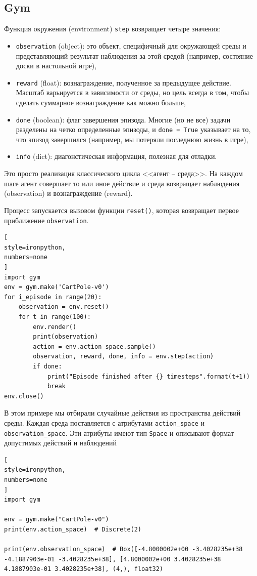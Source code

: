 \documentclass[%
	11pt,
	a4paper,
	utf8,
		]{article}
\begin{document}
\subsection{Gym}

Функция окружения (environment) \texttt{step} возвращает четыре значения:
\begin{itemize}
	\item \verb|observation| (object):  это объект, специфичный для окружающей среды и представляющий результат наблюдения за этой средой (например, состояние доски в настольной игре),
	
	\item \verb|reward| (float): вознаграждение, полученное за предыдущее действие. Масштаб варьируется в зависимости от среды, но цель всегда в том, чтобы сделать суммарное вознаграждение как можно больше,
	
	\item \verb|done| (boolean): флаг завершения эпизода. Многие (но не все) задачи разделены на четко определенные эпизоды, и \texttt{done = True} указывает на то, что эпизод завершился (например, мы потеряли последнюю жизнь в игре),
	
	\item \verb|info| (dict): диагонстическая информация, полезная для отладки.
\end{itemize}

Это просто реализация классического цикла <<агент -- среда>>. На каждом шаге агент совершает то или иное действие и среда возвращает наблюдения (observation) и вознаграждение (reward).

Процесс запускается вызовом функции \verb|reset()|, которая возвращает первое приближение \texttt{observation}.  
\begin{lstlisting}[
style=ironpython,
numbers=none
]
import gym
env = gym.make('CartPole-v0')
for i_episode in range(20):
    observation = env.reset()
    for t in range(100):
        env.render()
        print(observation)
        action = env.action_space.sample()
        observation, reward, done, info = env.step(action)
        if done:
            print("Episode finished after {} timesteps".format(t+1))
            break
env.close()
\end{lstlisting}

В этом примере мы отбирали случайные действия из пространства действий среды. Каждая среда поставляется с атрибутами \verb|action_space| и \verb|observation_space|. Эти атрибуты имеют тип \verb|Space| и описывают формат допустимых действий и наблюдений
\begin{lstlisting}[
style=ironpython,
numbers=none
]
import gym

env = gym.make("CartPole-v0")
print(env.action_space)  # Discrete(2)

print(env.observation_space)  # Box([-4.8000002e+00 -3.4028235e+38 -4.1887903e-01 -3.4028235e+38], [4.8000002e+00 3.4028235e+38 4.1887903e-01 3.4028235e+38], (4,), float32)
\end{lstlisting}
\end{document}
